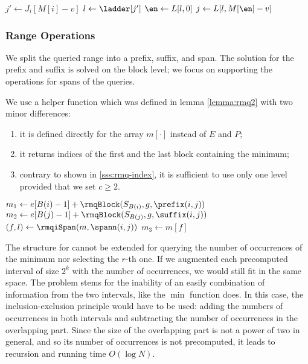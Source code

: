 \begin{algorithm}
\begin{algorithmic}
	\State $j' \gets J_i[M[i] - v]$ 
	\State $l \gets \ladder[j']$ 
	\State $\en \gets L[l, 0]$
	\State $j \gets L[l, M[\en] - v]$ 
	\State {}
\EndFunction
\end{algorithmic}
\end{algorithm}

\subsubsection{Range Operations}

We split the queried range into a prefix, suffix, and span.
The solution for the prefix and suffix is solved on the block level; we focus on supporting the operations for spans of the queries.

We use a helper function \rmqiSpan{} which was defined in lemma \ref{lemma:rmq2} with two minor differences:
\begin{enumerate}
	\item it is defined directly for the array $m[\cdot]$ instead of $E$ and $P$;
	\item it returns indices of the first and the last block containing the minimum;
	\item contrary to \rmqi{} shown in \ref{sss:rmq-index}, it is sufficient to use only one level provided that we set $c \ge 2$.
\end{enumerate}

\begin{algorithm}
\begin{algorithmic}
	\State $m_1 \gets e[B(i) - 1] + \rmqBlock(S_{B(i)}, g, \prefix(i, j))$
	\State $m_2 \gets e[B(j) - 1] + \rmqBlock(S_{B(j)}, g, \suffix(i, j))$
	\State $(f, l) \gets \rmqiSpan(m, \spann(i, j))$
	\State $m_3 \gets m[f]$
	\State {}
\EndFunction
\end{algorithmic}
\end{algorithm}

The structure for \rmqiSpan{} cannot be extended for querying the number of occurrences of the minimum nor selecting the $r$-th one.
If we augmented each precomputed interval of size $2^k$ with the number of occurrences, we would still fit in the same space.
The problem stems for the inability of an easily combination of information from the two intervals, like the $\min$ function does.
In this case, the inclusion-exclusion principle would have to be used: adding the numbers of occurrences in both intervals and subtracting the number of occurrences in the overlapping part.
Since the size of the overlapping part is not a power of two in general, and so its number of occurrences is not precomputed, it leads to recursion and running time $O(\log N)$.


